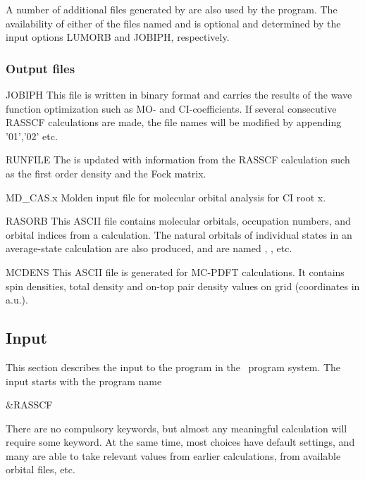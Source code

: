 A number of additional files generated by  are also used by the
 program.
The availability of either of the files named  and
 is optional and determined by the input options
LUMORB and JOBIPH, respectively.

\subsubsection{Output files}
\label{UG:sec:rasscf_output_files}

\begin{filelist}
\item[JOBIPH]
This file is written in binary format and carries the results
of the wave function optimization such as MO- and CI-coefficients.
If several consecutive RASSCF calculations are made, the file names will
be modified by appending '01','02' etc.
\item[RUNFILE]
The  is updated with information from the RASSCF calculation
such as the first order density and the Fock matrix.
\item[MD\_CAS.x]
Molden input file for molecular orbital analysis for CI root x.
\item[RASORB]
This ASCII file contains molecular orbitals, occupation numbers, and
orbital indices from a  calculation. The natural orbitals
of individual states in an average-state calculation are also produced,
and are named , , etc.
\item[MCDENS]
This ASCII file is generated for MC-PDFT calculations.
It contains spin densities, total density and on-top pair density values on grid (coordinates in a.u.).
\end{filelist}

\subsection{Input}
\label{UG:sec:rasscf_inp}

This section describes the input to the
 program in the \molcas\ program system. The input starts
with the program name
\begin{inputlisting}
 &RASSCF
\end{inputlisting}

There are no compulsory keywords, but almost any meaningful calculation
will require some keyword. At the same time, most choices have default
settings, and many are able to take relevant values from earlier
calculations, from available orbital files, etc.


